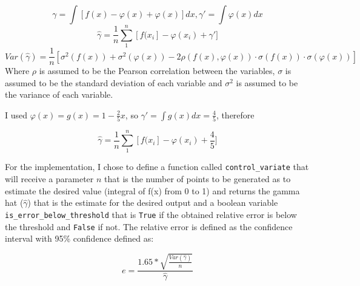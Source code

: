 \documentclass{homework}
\begin{document}
\begin{equation}
    \gamma = \int [f(x) - \varphi(x) + \varphi(x)]dx, \gamma' = \int \varphi(x)dx
\end{equation}
\begin{equation}
    \hat \gamma = \frac{1}{n}\sum_1^n [f(x_i] - \varphi(x_i) + \gamma']
\end{equation}
\begin{equation}
    Var(\hat\gamma) = \frac{1}{n} [ \sigma^2(f(x)) + \sigma^2(\varphi(x)) - 2 \rho(f(x), \varphi(x))\cdot\sigma(f(x))\cdot\sigma(\varphi(x))]
\end{equation}
Where $\rho$ is assumed to be the Pearson correlation between the variables, $\sigma$ is assumed to be the standard deviation of each variable and $\sigma^2$ is assumed to be the variance of each variable.

I used $\varphi(x) = g(x) = 1 - \frac{2}{5}x$, so $\gamma' = \int g(x)dx = \frac{4}{5}$, therefore

\begin{equation}
    \hat \gamma = \frac{1}{n}\sum_1^n [f(x_i] - \varphi(x_i) + \frac{4}{5}]
\end{equation}

For the implementation, I chose to define a function called \verb|control_variate| that will receive a parameter $n$ that is the number of points to be generated as to estimate the desired value (integral of f(x) from 0 to 1) and returns the gamma hat ($\hat \gamma$) that is the estimate for the desired output and a boolean variable \verb|is_error_below_threshold| that is \verb|True| if the obtained relative error is below the threshold and \verb|False| if not. The relative error is defined as the confidence interval with 95\% confidence defined as:

\begin{equation}
e = \frac{1.65*\sqrt{\frac{Var(\hat \gamma)}{n}}}{\hat \gamma}
\end{equation}
\end{document}
